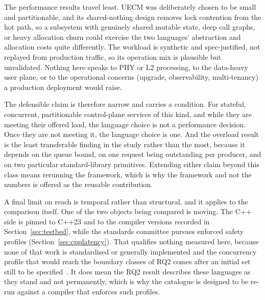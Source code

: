 The performance results travel least. UECM was deliberately chosen to be small and partitionable,
and its shared-nothing design removes lock contention from the hot path, so a subsystem with
genuinely shared mutable state, deep call graphs, or heavy allocation churn could exercise the two
languages' abstraction and allocation costs quite differently. The workload is synthetic and
spec-justified, not replayed from production traffic, so its operation mix is plausible but
unvalidated. Nothing here speaks to PHY or L2 processing, to the data-heavy user plane, or to the
operational concerns (upgrade, observability, multi-tenancy) a production deployment would raise.

The defensible claim is therefore narrow and carries a condition. For stateful, concurrent,
partitionable control-plane services of this kind, and while they are meeting their offered load,
the language choice is not a performance decision. Once they are not meeting it, the language
choice is one. And the overload result is the least transferable finding in the study rather than
the most, because it depends on the queue bound, on one request being outstanding per producer,
and on two particular standard-library primitives. Extending either claim beyond this class means
rerunning the framework, which is why the framework and not the numbers is offered as the reusable
contribution.

A final limit on reach is temporal rather than structural, and it applies to the comparison
itself. One of the two objects being compared is moving. The C++ side is pinned to C++23 and to
the compiler versions recorded in Section~\ref{sec:testbed}, while the standards committee pursues
enforced safety profiles (Section~\ref{sec:cpplatency}). That qualifies nothing measured here,
because none of that work is standardised or generally implemented and the concurrency profile
that would reach the boundary classes of RQ2 comes after an initial set still to be
specified~\cite{vandevoorde2026profiles}. It does mean the RQ2 result describes these languages as
they stand and not permanently, which is why the catalogue is designed to be re-run against a
compiler that enforces such profiles.

